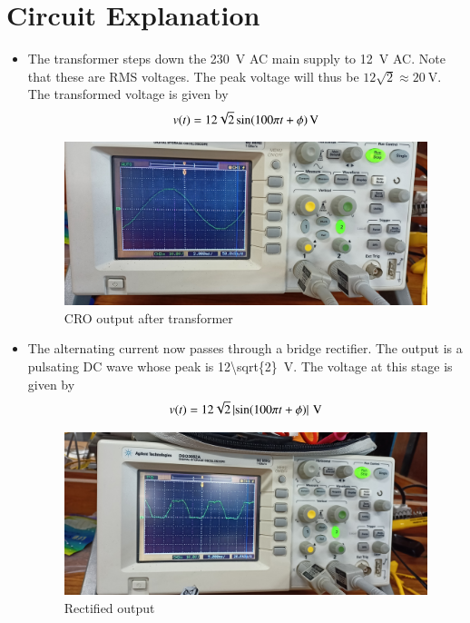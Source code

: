 \documentclass[journal,12pt,twocolumn]{IEEEtran}
\providecommand{\abs}[1]{\left\vert#1\right\vert}
\numberwithin{equation}{section}
\numberwithin{figure}{section}
\begin{document}
	\section{Circuit Explanation}
	\begin{itemize}
	\item The transformer steps down the \SI{230}{\volt} AC main supply to \SI{12}{\volt} AC. Note that these are RMS voltages. The peak voltage will thus be $12\sqrt{2} \approx \SI{20}{\volt}$. The transformed voltage is given by
	\begin{align}
		v(t) = \SI[parse-numbers=false]{12\sqrt{2}\sin(100\pi t + \phi)}{\volt}
	\end{align}
	\begin{figure}[!ht]
		\centering
		\includegraphics[width=\columnwidth]{./figs/transformer.jpg}
		\caption{CRO output after transformer}
		\label{fig-transformer}	
	\end{figure}
	
	\item The alternating current now passes through a bridge rectifier. The output is a pulsating DC wave whose peak is \SI[parse-numbers=false]{12\sqrt{2}}{\volt}. The voltage at this stage is given by
	\begin{align}
		v(t) = \SI[parse-numbers=false]{12\sqrt{2}\abs{\sin(100\pi t + \phi)}}{\volt}
	\end{align}

	\begin{figure}[!ht]
		\centering
		\includegraphics[width=\columnwidth]{./figs/rectifier-1.jpg}
		\caption{Rectified output}
		\label{fig-rectifier-1}	
	\end{figure}
	

\end{itemize}
\end{document}
